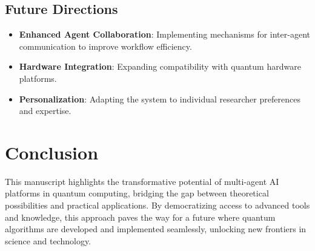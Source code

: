 \documentclass[12pt]{article}
\begin{document}
\subsection{Future Directions}
\begin{itemize}
    \item \textbf{Enhanced Agent Collaboration}: Implementing mechanisms for inter-agent communication to improve workflow efficiency.
    \item \textbf{Hardware Integration}: Expanding compatibility with quantum hardware platforms.
    \item \textbf{Personalization}: Adapting the system to individual researcher preferences and expertise.
\end{itemize}

\section{Conclusion}
This manuscript highlights the transformative potential of multi-agent AI platforms in quantum computing, bridging the gap between theoretical possibilities and practical applications. By democratizing access to advanced tools and knowledge, this approach paves the way for a future where quantum algorithms are developed and implemented seamlessly, unlocking new frontiers in science and technology.



\end{document}
